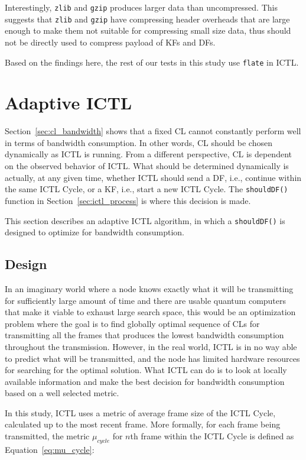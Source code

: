 \documentclass[12pt]{report}
\begin{document}
Interestingly, \texttt{zlib} and \texttt{gzip} produces larger data than uncompressed. This suggests that \texttt{zlib} and \texttt{gzip} have compressing header overheads that are large enough to make them not suitable for compressing small size data, thus should not be directly used to compress payload of KFs and DFs.

Based on the findings here, the rest of our tests in this study use \texttt{flate} in ICTL.

\section{Adaptive ICTL}
\label{sec:adaptive_ictl}

Section~\ref{sec:cl_bandwidth} shows that a fixed CL cannot constantly perform well in terms of bandwidth consumption. In other words, CL should be chosen dynamically as ICTL is running. From a different perspective, CL is dependent on the observed behavior of ICTL. What should be determined dynamically is actually, at any given time, whether ICTL should send a DF, i.e., continue within the same ICTL Cycle, or a KF, i.e., start a new ICTL Cycle. The \texttt{shouldDF()} function in Section~\ref{sec:ictl_process} is where this decision is made.

This section describes an adaptive ICTL algorithm, in which a \texttt{shouldDF()} is designed to optimize for bandwidth consumption.

\subsection{Design}

In an imaginary world where a node knows exactly what it will be transmitting for sufficiently large amount of time and there are usable quantum computers that make it viable to exhaust large search space, this would be an optimization problem where the goal is to find globally optimal sequence of CLs for transmitting all the frames that produces the lowest bandwidth consumption throughout the transmission. However, in the real world, ICTL is in no way able to predict what will be transmitted, and the node has limited hardware resources for searching for the optimal solution. What ICTL can do is to look at locally available information and make the best decision for bandwidth consumption based on a well selected metric. 

In this study, ICTL uses a metric of average frame size of the ICTL Cycle, calculated up to the most recent frame. More formally, for each frame being transmitted, the metric $\mu_{cycle}$ for $n$th frame within the ICTL Cycle is defined as Equation~\ref{eq:mu_cycle}:
\end{document}
